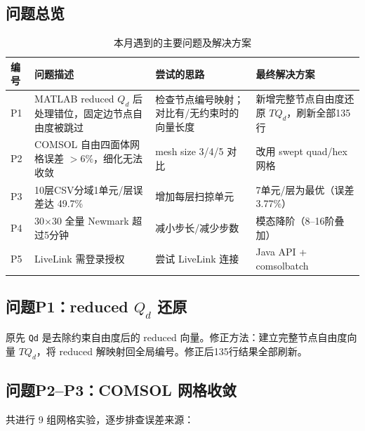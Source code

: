 \documentclass[12pt,a4paper]{ctexart}
\begin{document}
\subsection{问题总览}

\begin{table}[H]
\centering
\caption{本月遇到的主要问题及解决方案}
\label{tab:problems}
\small
\begin{tabularx}{\textwidth}{>{\centering}p{0.6cm}|p{3.2cm}|p{3.2cm}|X}
\toprule
\textbf{编号} & \textbf{问题描述} & \textbf{尝试的思路} & \textbf{最终解决方案} \\
\midrule
P1 & MATLAB reduced $Q_d$ 后处理错位，固定边节点自由度被跳过 & 检查节点编号映射；对比有/无约束时的向量长度 & 新增完整节点自由度还原 $TQ_d$，刷新全部135行 \\
\midrule
P2 & COMSOL 自由四面体网格误差 $>6\%$，细化无法收敛 & mesh size 3/4/5 对比 & 改用 swept quad/hex 网格 \\
\midrule
P3 & 10层CSV分域1单元/层误差达 49.7\% & 增加每层扫掠单元 & 7单元/层为最优（误差3.77\%） \\
\midrule
P4 & 30$\times$30 全量 Newmark 超过5分钟 & 减小步长/减少步数 & 模态降阶（8--16阶叠加） \\
\midrule
P5 & LiveLink 需登录授权 & 尝试 LiveLink 连接 & Java API + comsolbatch \\
\bottomrule
\end{tabularx}
\end{table}

\subsection{问题P1：reduced $Q_d$ 还原}

原先 \texttt{Qd} 是去除约束自由度后的 reduced 向量。修正方法：建立完整节点自由度向量 $TQ_d$，将 reduced 解映射回全局编号。修正后135行结果全部刷新。

\subsection{问题P2--P3：COMSOL 网格收敛}

共进行 9 组网格实验，逐步排查误差来源：
\end{document}
